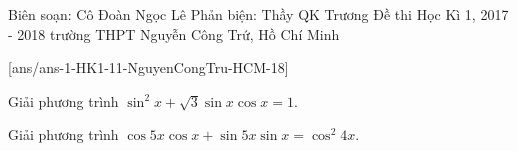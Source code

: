 	\begin{name}
{Biên soạn: Cô Đoàn Ngọc Lê \newline Phản biện: Thầy QK Trương }
		{Đề thi Học Kì 1, 2017 - 2018 trường THPT Nguyễn Công Trứ, Hồ Chí Minh}
	\end{name}
\setcounter{ex}{0}\setcounter{bt}{0}
[ans/ans-1-HK1-11-NguyenCongTru-HCM-18]
\begin{bt}%
Giải phương trình $\sin^2 x+\sqrt{3}\sin x\cos x=1$.
\end{bt}

\begin{bt}%
Giải phương trình $\cos 5x\cos x+\sin 5x \sin x=\cos^2 4x$.
\end{bt}

